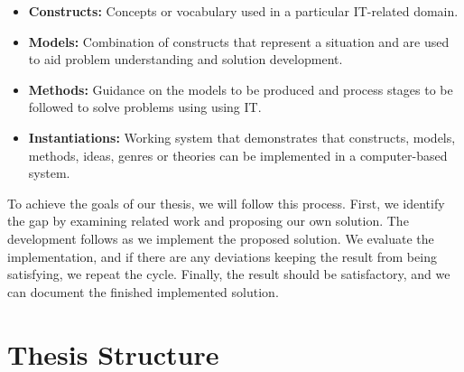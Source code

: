 \begin{itemize}
    \item \textbf{Constructs:} Concepts or vocabulary used in a particular IT-related domain.
    \item \textbf{Models:} Combination of constructs that represent a situation and are used to aid problem understanding and solution development.
    \item \textbf{Methods:} Guidance on the models to be produced and process stages to be followed to solve problems using using IT.
    \item \textbf{Instantiations:} Working system that demonstrates that constructs, models, methods, ideas, genres or theories can be implemented in a computer-based system.
\end{itemize}


\noindent To achieve the goals of our thesis, we will follow this process. First, we identify the gap by examining related work and proposing our own solution. The development follows as we implement the proposed solution. We evaluate the implementation, and if there are any deviations keeping the result from being satisfying, we repeat the cycle. Finally, the result should be satisfactory, and we can document the finished implemented solution.



\section{Thesis Structure}


